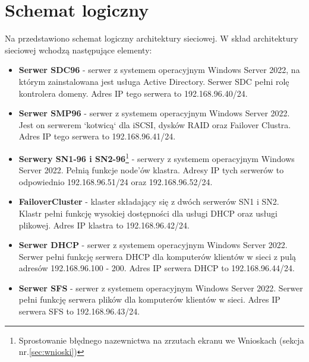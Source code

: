 	\newpage
\section{Schemat logiczny}		%


Na  przedstawiono schemat logiczny architektury sieciowej. W skład architektury sieciowej wchodzą następujące elementy:

\begin{itemize}
	\item \textbf{Serwer SDC96} - serwer z systemem operacyjnym Windows Server 2022, na którym zainstalowana jest usługa Active Directory. Serwer SDC pełni rolę kontrolera domeny. Adres IP tego serwera to 192.168.96.40/24.
	\item \textbf{Serwer SMP96} - serwer z systemem operacyjnym Windows Server 2022. Jest on serwerem `kotwicą` dla iSCSI, dysków RAID oraz Failover Clustra. Adres IP tego serwera to 192.168.96.41/24. 
	\item \textbf{Serwery SN1-96 i SN2-96}\footnote{Sprostowanie błędnego nazewnictwa na zrzutach ekranu we Wnioskach (sekcja nr.\ref{sec:wnioski})} - serwery z systemem operacyjnym Windows Server 2022. Pełnią funkcje node'ów klastra. Adresy IP tych serwerów to odpowiednio 192.168.96.51/24 oraz 192.168.96.52/24.
	\item \textbf{FailoverCluster} - klaster składający się z dwóch serwerów SN1 i SN2. Klastr pełni funkcję wysokiej dostępności dla usługi DHCP oraz usługi plikowej. Adres IP klastra to 192.168.96.42/24.
	\item \textbf{Serwer DHCP} - serwer z systemem operacyjnym Windows Server 2022. Serwer pełni funkcję serwera DHCP dla komputerów klientów w sieci z pulą adresów 192.168.96.100 - 200. Adres IP serwera DHCP to 192.168.96.44/24.
	\item \textbf{Serwer SFS} - serwer z systemem operacyjnym Windows Server 2022. Serwer pełni funkcję serwera plików dla komputerów klientów w sieci. Adres IP serwera SFS to 192.168.96.43/24.
\end{itemize}